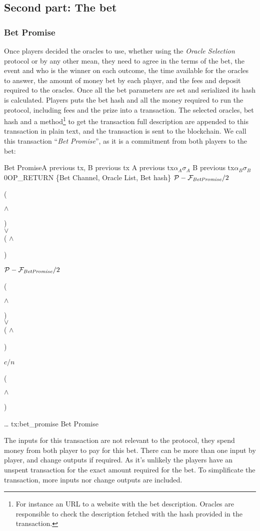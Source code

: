 \subsection{Second part: The bet}

\subsubsection{Bet Promise}
Once players decided the oracles to use, whether using the \textit{Oracle
  Selection} protocol or by any other mean, they need to agree in the terms of
  the bet, the event and who is the winner on each outcome, the time available
  for the oracles to answer, the amount of money bet by each player, and the
  fees and deposit required to the oracles.
Once all the bet parameters are set and serialized its hash is calculated.
Players puts the bet hash and all the money required to run the protocol,
  including fees and the prize into a transaction.
The selected oracles, bet hash and a method\footnote{For instance an URL to a
  website with the bet description. Oracles are responsible to check the
  description fetched with the hash provided in the transaction.} to get the
  transaction full description are appended to this transaction in plain text,
  and the transaction is sent to the blockchain.
We call this transaction ``\textit{Bet Promise}'', as it is a commitment from both
  players to the bet:

\transaction
    {Bet Promise}{A previous tx, B previous tx}
    {A previous tx}{$\alpha_A$}{$\sigma_A$}
    {B previous tx}{$\alpha_B$}{$\sigma_B$}
    \stopinputs
    {0}{\footnotesize{OP\_RETURN \{Bet Channel, Oracle List, Bet hash\}}}
    {$\mathcal{P} - \mathcal{F}_{\mathit{Bet Promise}} / 2$}{(\signature{A} $\wedge$ \signature{B}) \\
                                                   $\vee$ \\
                                            ( $\wedge$ \signature{A}) }
    {$\mathcal{P} - \mathcal{F}_{\mathit{Bet Promise}} / 2$}{(\signature{A} $\wedge$ \signature{B}) \\
                                                   $\vee$ \\
                                            ( $\wedge$ \signature{B}) }
    {$c/n$}{(\signature{A} $\wedge$ \signature{B})}
    {\ldots }{}
    \stopoutputs
    {tx:bet_promise}
    {Bet Promise}

The inputs for this transaction are not relevant to the protocol, they spend
  money from both player to pay for this bet.
There can be more than one input by player, and change outputs if required.
As it's unlikely the players have an unspent transaction for the exact amount
  required for the bet.
To simplificate the transaction, more inputs nor change outputs are included.


